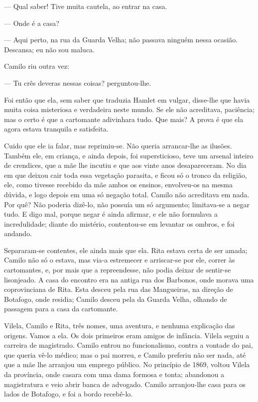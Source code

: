 --- Qual saber! Tive muita cautela, ao entrar na casa.

--- Onde é a casa?

--- Aqui perto, na rua da Guarda Velha; não passava ninguém nessa
ocasião. Descansa; eu não sou maluca.

Camilo riu outra vez:

--- Tu crês deveras nessas coisas? perguntou-lhe.

Foi então que ela, sem saber que traduzia Hamlet em vulgar, disse-lhe
que havia muita coisa misteriosa e verdadeira neste mundo. Se ele não
acreditava, paciência; mas o certo é que a cartomante adivinhara tudo.
Que mais? A prova é que ela agora estava tranquila e satisfeita.

Cuido que ele ia falar, mas reprimiu-se. Não queria arrancar-lhe as
ilusões. Também ele, em criança, e ainda depois, foi supersticioso, teve
um arsenal inteiro de crendices, que a mãe lhe incutiu e que aos vinte
anos desapareceram. No dia em que deixou cair toda essa vegetação
parasita, e ficou só o tronco da religião, ele, como tivesse recebido da
mãe ambos os ensinos, envolveu-os na mesma dúvida, e logo depois em uma
só negação total. Camilo não acreditava em nada. Por quê? Não poderia
dizê-lo, não possuía um só argumento; limitava-se a negar tudo. E digo
mal, porque negar é ainda afirmar, e ele não formulava a incredulidade;
diante do mistério, contentou-se em levantar os ombros, e foi andando.

Separaram-se contentes, ele ainda mais que ela. Rita estava certa de ser
amada; Camilo não só o estava, mas via-a estremecer e arriscar-se por
ele, correr às cartomantes, e, por mais que a repreendesse, não podia
deixar de sentir-se lisonjeado. A casa do encontro era na antiga rua dos
Barbonos, onde morava uma coprovinciana de Rita. Esta desceu pela rua
das Mangueiras, na direção de Botafogo, onde residia; Camilo desceu pela
da Guarda Velha, olhando de passagem para a casa da cartomante.

Vilela, Camilo e Rita, três nomes, uma aventura, e nenhuma explicação
das origens. Vamos a ela. Os dois primeiros eram amigos de infância.
Vilela seguiu a carreira de magistrado. Camilo entrou no funcionalismo,
contra a vontade do pai, que queria vê-lo médico; mas o pai morreu, e
Camilo preferiu não ser nada, até que a mãe lhe arranjou um emprego
público. No princípio de 1869, voltou Vilela da província, onde casara
com uma dama formosa e tonta; abandonou a magistratura e veio abrir
banca de advogado. Camilo arranjou-lhe casa para os lados de Botafogo, e
foi a bordo recebê-lo.

